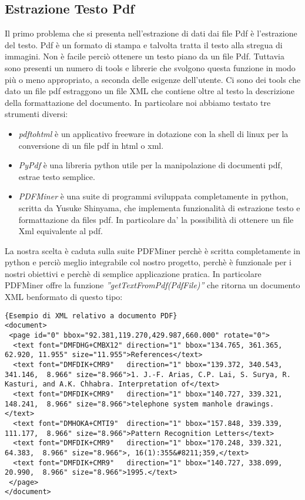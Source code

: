 \subsection{Estrazione Testo Pdf}
Il primo problema che si presenta nell'estrazione di dati dai file Pdf è l'estrazione del testo. Pdf è un formato di stampa e talvolta tratta il testo alla stregua di immagini. Non è facile perciò ottenere un testo piano da un file Pdf. Tuttavia sono presenti un numero di tools e librerie che svolgono questa funzione in modo più o meno appropriato, a seconda delle esigenze dell'utente. Ci sono dei tools che dato un file pdf estraggono un file XML che contiene oltre al testo la descrizione della formattazione del documento. 
In particolare noi abbiamo testato tre strumenti diversi:
\begin{itemize}
 \item \textit{pdftohtml} è un applicativo freeware in dotazione con la shell di linux per la conversione di un file pdf in html o xml.
 \item \textit{PyPdf} è una libreria python utile per la manipolazione di documenti pdf, estrae testo semplice.
 \item \textit{PDFMiner} è una suite di programmi sviluppata completamente in python, scritta da Yusuke Shinyama, che implementa funzionalità di estrazione testo e formattazione da files pdf. In particolare da' la possibilità di ottenere un file Xml equivalente al pdf.
\end{itemize}

La nostra scelta è caduta sulla suite PDFMiner perchè è scritta completamente in python e perciò meglio integrabile col nostro progetto, perchè è funzionale per i nostri obiettivi e perchè di semplice applicazione pratica.
In particolare PDFMiner offre la funzione \textit{''getTextFromPdf(PdfFile)''} che ritorna un documento XML benformato di questo tipo:

\begin{lstlisting}[frame=r,caption=Esempio di XML relativo a documento PDF ,breaklines=true,basicstyle=\small]{Esempio di XML relativo a documento PDF}
<document>
 <page id="0" bbox="92.381,119.270,429.987,660.000" rotate="0">
  <text font="DMFDHG+CMBX12" direction="1" bbox="134.765, 361.365,  62.920, 11.955" size="11.955">References</text>
  <text font="DMFDIK+CMR9"   direction="1" bbox="139.372, 340.543, 341.146,  8.966" size="8.966">1. J.-F. Arias, C.P. Lai, S. Surya, R. Kasturi, and A.K. Chhabra. Interpretation of</text>
  <text font="DMFDIK+CMR9"   direction="1" bbox="140.727, 339.321, 148.241,  8.966" size="8.966">telephone system manhole drawings.</text>
  <text font="DMHOKA+CMTI9"  direction="1" bbox="157.848, 339.339, 111.177,  8.966" size="8.966">Pattern Recognition Letters</text>
  <text font="DMFDIK+CMR9"   direction="1" bbox="170.248, 339.321,  64.383,  8.966" size="8.966">, 16(1):355&#8211;359,</text>
  <text font="DMFDIK+CMR9"   direction="1" bbox="140.727, 338.099,  20.990,  8.966" size="8.966">1995.</text>
 </page>
</document>
\end{lstlisting}



